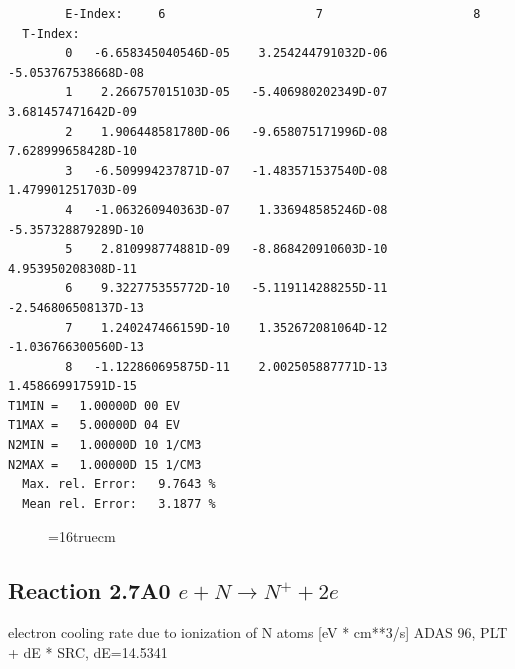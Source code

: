 \documentclass[12pt,dvipdfmx]{article}
\begin{document}
\begin{small}
\begin{verbatim}
        E-Index:     6                     7                     8
  T-Index:
        0   -6.658345040546D-05    3.254244791032D-06   -5.053767538668D-08
        1    2.266757015103D-05   -5.406980202349D-07    3.681457471642D-09
        2    1.906448581780D-06   -9.658075171996D-08    7.628999658428D-10
        3   -6.509994237871D-07   -1.483571537540D-08    1.479901251703D-09
        4   -1.063260940363D-07    1.336948585246D-08   -5.357328879289D-10
        5    2.810998774881D-09   -8.868420910603D-10    4.953950208308D-11
        6    9.322775355772D-10   -5.119114288255D-11   -2.546806508137D-13
        7    1.240247466159D-10    1.352672081064D-12   -1.036766300560D-13
        8   -1.122860695875D-11    2.002505887771D-13    1.458669917591D-15
T1MIN =   1.00000D 00 EV
T1MAX =   5.00000D 04 EV
N2MIN =   1.00000D 10 1/CM3
N2MAX =   1.00000D 15 1/CM3
  Max. rel. Error:   9.7643 %
  Mean rel. Error:   3.1877 %
\end{verbatim}\end{small}

\begin{figure} \label{2.6il}
\epsfxsize=16truecm
\end{figure}
\newpage

\subsection{
  Reaction 2.7A0  $e + N  \rightarrow N^+   + 2e $
}
electron cooling rate due to ionization of N atoms [eV * cm**3/s]
ADAS 96, PLT + dE * SRC, dE=14.5341
\end{document}
